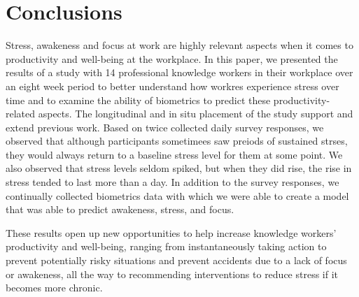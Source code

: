\section{Conclusions} 
Stress, awakeness and focus at work are highly relevant aspects when
it comes to productivity and well-being at the workplace. In this
paper, we presented the results of a study with 14 professional
knowledge workers in their workplace over an eight week period to
better understand how workres experience stress over time and to
examine the ability of biometrics to predict these
productivity-related aspects. The longitudinal and in situ placement of
the study support and extend previous work. Based on
twice collected daily survey responses, we observed that
although participants sometimees saw preiods of sustained strses,
they would always return to a baseline stress level for them
at some point. We also observed that stress levels seldom spiked,
but when they did rise, the rise in stress tended to last more
than a day. In addition to the survey responses, we 
continually collected
biometrics data with which we were able to create a model that was able to
predict awakeness, stress, and focus.

These results open up new opportunities to help increase knowledge
workers' productivity and well-being, ranging from instantaneously
taking action to prevent potentially risky situations and prevent
accidents due to a lack of focus or awakeness, all the way to
recommending interventions to reduce stress if it becomes more
chronic.




